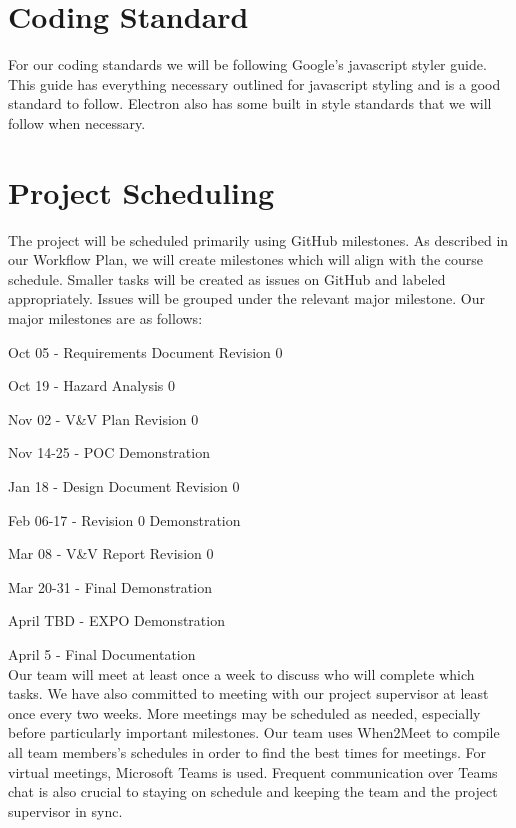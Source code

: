 \documentclass{article}
\begin{document}
\section{Coding Standard}
  
For our coding standards we will be following Google's javascript styler guide. This guide has everything
necessary outlined for javascript styling and is a good standard to follow. Electron also has some built in 
style standards that we will follow when necessary.

\section{Project Scheduling}

\noindent The project will be scheduled primarily using GitHub milestones. As described in our Workflow Plan, we will create milestones which will align with the course schedule. Smaller tasks will be created as issues on GitHub and labeled appropriately. Issues will be grouped under the relevant major milestone. Our major milestones are as follows:

\item Oct 05 - Requirements Document Revision 0
\item Oct 19 - Hazard Analysis 0 
\item Nov 02 - V\&V Plan Revision 0
\item Nov 14-25 - POC Demonstration
\item Jan 18 - Design Document Revision 0
\item Feb 06-17 - Revision 0 Demonstration
\item Mar 08 - V\&V Report Revision 0
\item Mar 20-31 - Final Demonstration
\item April TBD - EXPO Demonstration
\item April 5 - Final Documentation \\

\noindent Our team will meet at least once a week to discuss who will complete which tasks. We have also committed to meeting with our project supervisor at least once every two weeks. More meetings may be scheduled as needed, especially before particularly important milestones. Our team uses When2Meet to compile all team members's schedules in order to find the best times for meetings. For virtual meetings, Microsoft Teams is used. Frequent communication over Teams chat is also crucial to staying on schedule and keeping the team and the project supervisor in sync. \\
\end{document}
